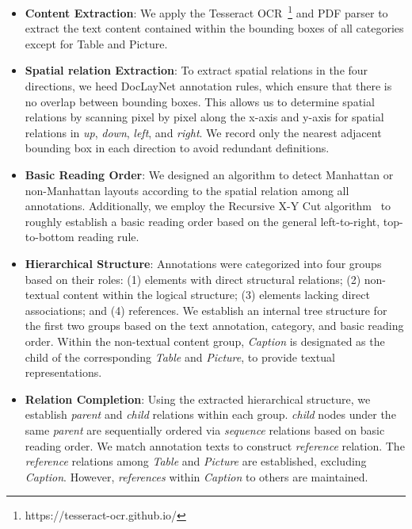 \begin{itemize}
    \item \textbf{Content Extraction}: We apply the Tesseract OCR~\footnote{https://tesseract-ocr.github.io/} and PDF parser to extract the text content contained within the bounding boxes of all categories except for Table and Picture.
    
    \item \textbf{Spatial relation Extraction}: To extract spatial relations in the four directions, we heed DocLayNet annotation rules, which ensure that there is no overlap between bounding boxes. This allows us to determine spatial relations by scanning pixel by pixel along the x-axis and y-axis for spatial relations in \textit{up}, \textit{down}, \textit{left}, and \textit{right}. We record only the nearest adjacent bounding box in each direction to avoid redundant definitions.
    
    \item \textbf{Basic Reading Order}: We designed an algorithm to detect Manhattan or non-Manhattan layouts according to the spatial relation among all annotations. Additionally, we employ the Recursive X-Y Cut algorithm~\citep{xycut} to roughly establish a basic reading order based on the general left-to-right, top-to-bottom reading rule.
    
    \item \textbf{Hierarchical Structure}: Annotations were categorized into four groups based on their roles: (1) elements with direct structural relations; (2) non-textual content within the logical structure; (3) elements lacking direct associations; and (4) references. We establish an internal tree structure for the first two groups based on the text annotation, category, and basic reading order. Within the non-textual content group, \textit{Caption} is designated as the child of the corresponding \textit{Table} and \textit{Picture}, to provide textual representations.
    
    \item \textbf{Relation Completion}: Using the extracted hierarchical structure, we establish \textit{parent} and \textit{child} relations within each group. \textit{child} nodes under the same \textit{parent} are sequentially ordered via \textit{sequence} relations based on basic reading order. We match annotation texts to construct \textit{reference} relation. The \textit{reference} relations among \textit{Table} and \textit{Picture} are established, excluding \textit{Caption}. However, \textit{references} within \textit{Caption} to others are maintained.

\end{itemize}

